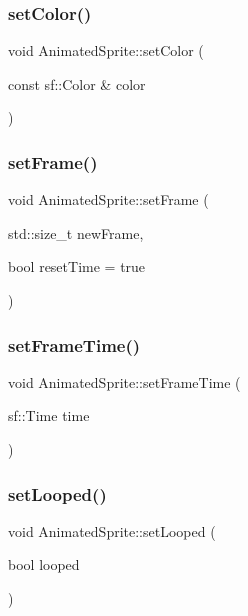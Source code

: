\subsubsection{\texorpdfstring{set\+Color()}{setColor()}}
{\footnotesize\ttfamily void Animated\+Sprite\+::set\+Color (\begin{DoxyParamCaption}\item[{const sf\+::\+Color \&}]{color }\end{DoxyParamCaption})}

\mbox{\label{class_animated_sprite_a0b3e38fffdc1d29f46fa08df9ef2a747}} 
\subsubsection{\texorpdfstring{set\+Frame()}{setFrame()}}
{\footnotesize\ttfamily void Animated\+Sprite\+::set\+Frame (\begin{DoxyParamCaption}\item[{std\+::size\+\_\+t}]{new\+Frame,  }\item[{bool}]{reset\+Time = {\ttfamily true} }\end{DoxyParamCaption})}

\mbox{\label{class_animated_sprite_af598fab5c3599ccc5ed1e2d4fefa68cc}} 
\subsubsection{\texorpdfstring{set\+Frame\+Time()}{setFrameTime()}}
{\footnotesize\ttfamily void Animated\+Sprite\+::set\+Frame\+Time (\begin{DoxyParamCaption}\item[{sf\+::\+Time}]{time }\end{DoxyParamCaption})}

\mbox{\label{class_animated_sprite_a855a5a48ea2e1c51c7c9304857dd2f8c}} 
\subsubsection{\texorpdfstring{set\+Looped()}{setLooped()}}
{\footnotesize\ttfamily void Animated\+Sprite\+::set\+Looped (\begin{DoxyParamCaption}\item[{bool}]{looped }\end{DoxyParamCaption})}


